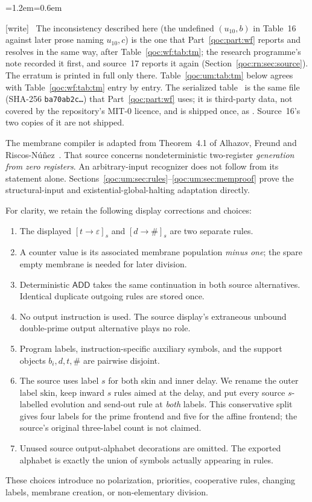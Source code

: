 \documentclass[11pt,letterpaper]{article}
\theoremstyle{definition}
\theoremstyle{remark}
\newcommand{\ADD}{\mathsf{ADD}}
\newcommand{\skin}{\mathrm{skin}}
\newcommand{\trap}{\#}
\newcommand{\eps}{\varepsilon}
\newcommand{\wtag}{\textup{[write]}}
\newenvironment{writenote}{\par\smallskip\begin{list}{}{\leftmargin=1.2em\rightmargin=0.6em}\item[]\small\wtag\ }{\end{list}\smallskip}
\begin{document}
\begin{writenote}
The inconsistency described here (the undefined $(u_{10},b)$ in Table~16 against later prose naming $u_{10},c$) is the one that Part~\ref{qoc:part:wf} reports and resolves in the same way, after Table~\ref{qoc:wf:tab:tm}; the research programme's note  recorded it first, and source~17 reports it again (Section~\ref{qoc:rn:sec:source}). The erratum is printed in full only there. Table~\ref{qoc:um:tab:tm} below agrees with Table~\ref{qoc:wf:tab:tm} entry by entry. The serialized table~\cite{um:serialization} is the same file (SHA-256 \texttt{ba70ab2c\ldots}) that Part~\ref{qoc:part:wf} uses; it is third-party data, not covered by the repository's MIT-0 licence, and is shipped once, as . Source~16's two copies of it are not shipped.
\end{writenote}


The membrane compiler is adapted from Theorem~4.1 of Alhazov, Freund and Riscos-N\'u\~nez~\cite{um:AFR}. That source concerns nondeterministic two-register \emph{generation from zero registers}. An arbitrary-input recognizer does not follow from its statement alone. Sections~\ref{qoc:um:sec:rules}--\ref{qoc:um:sec:memproof} prove the structural-input and existential-global-halting adaptation directly.

For clarity, we retain the following display corrections and choices:
\begin{enumerate}
\item The displayed $[t\to\eps]_s$ and $[d\to\trap]_s$ are two separate rules.
\item A counter value is its associated membrane population \emph{minus one}; the spare empty membrane is needed for later division.
\item Deterministic $\ADD$ takes the same continuation in both source alternatives. Identical duplicate outgoing rules are stored once.
\item No output instruction is used. The source display's extraneous unbound double-prime output alternative plays no role.
\item Program labels, instruction-specific auxiliary symbols, and the support objects $b_i,d,t,\trap$ are pairwise disjoint.
\item The source uses label $s$ for both skin and inner delay. We rename the outer label $\skin$, keep inward $s$ rules aimed at the delay, and put every source $s$-labelled evolution and send-out rule at \emph{both} labels. This conservative split gives four labels for the prime frontend and five for the affine frontend; the source's original three-label count is not claimed.
\item Unused source output-alphabet decorations are omitted. The exported alphabet is exactly the union of symbols actually appearing in rules.
\end{enumerate}
These choices introduce no polarization, priorities, cooperative rules, changing labels, membrane creation, or non-elementary division.
\end{document}
